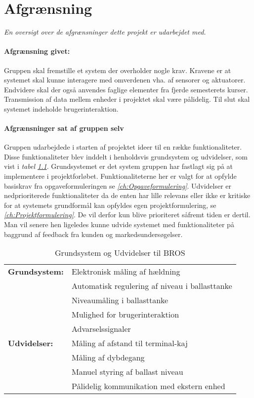 \chapter{Afgrænsning}
\label{ch:afgraensning}
\textit{En oversigt over de afgrænsninger dette projekt er udarbejdet med.}
\subsubsection{Afgrænsning givet:}
Gruppen skal fremstille et system der overholder nogle krav. Kravene er at systemet skal kunne interagere med omverdenen vha. af sensorer og aktuatorer. Endvidere skal der også anvendes faglige elementer fra fjerde semesterets kurser. Transmission af data mellem enheder i projektet skal være pålidelig. Til slut skal systemet indeholde brugerinteraktion. 
\subsubsection{Afgrænsninger sat af gruppen selv}
Gruppen udarbejdede i starten af projektet ideer til en række funktionaliteter. Disse funktionaliteter blev inddelt i henholdsvis grundsystem og udvidelser, som vist i \textit{tabel \ref{tabel:Grundogudvid}}.
Grundsystemet er det system gruppen har fastlagt sig på at implementere i projektforløbet. Funktionaliteterne her er valgt for at opfylde basiskrav fra opgaveformuleringen se \textit{\ref{ch:Opgaveformulering}}.
Udvidelser er nedprioriterede funktionaliteter da de enten har lille relevans eller ikke er kritiske for at systemets grundformål kan opfyldes egen projektformulering, se \textit{\ref{ch:Projektformulering}}. De vil derfor kun blive prioriteret såfremt tiden er dertil. 
Man vil senere hen ligeledes kunne udvide systemet med funktionaliteter på baggrund af feedback fra kunden og markedsundersøgelser.

\begin{table}[H]
\centering
\begin{tabular}{|l|l|}
\hline
\textbf{Grundsystem:} &Elektronisk måling af hældning\\
 &Automatisk regulering af niveau i ballasttanke\\
 &Niveaumåling i ballasttanke\\
 &Mulighed for brugerinteraktion\\
 &Advarselssignaler\\\hline
\textbf{Udvidelser:} &Måling af afstand til terminal-kaj\\
 &Måling af dybdegang\\
 &Manuel styring af ballast niveau\\
 &Pålidelig kommunikation med ekstern enhed\\\hline
\end{tabular}
\caption{Grundsystem og Udvidelser til BROS}
\label{tabel:Grundogudvid}
\end{table}